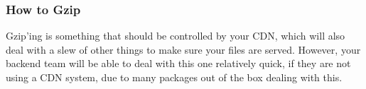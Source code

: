 \subsubsection{ How to Gzip }
Gzip'ing is something that should be controlled by your CDN, which will also 
deal with a slew of other things to make sure your files are served. However, 
your backend team will be able to deal with this one relatively quick, if they 
are not using a CDN system, due to many packages out of the box dealing with 
this. 

